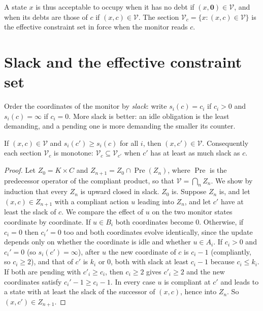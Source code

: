 A state $x$ is thus acceptable to occupy when it has no debt if $(x,\mathbf 0)\in\mathcal V$, and when its debts are those of $c$ if $(x,c)\in\mathcal V$. The section $\mathcal V_c=\{x:(x,c)\in\mathcal V\}$ is the effective constraint set in force when the monitor reads $c$.

\section{Slack and the effective constraint set}

Order the coordinates of the monitor by \emph{slack}: write $s_i(c)=c_i$ if $c_i>0$ and $s_i(c)=\infty$ if $c_i=0$. More slack is better: an idle obligation is the least demanding, and a pending one is more demanding the smaller its counter.

\begin{newresult}\label{prop:slack}
If $(x,c)\in\mathcal V$ and $s_i(c')\ge s_i(c)$ for all $i$, then $(x,c')\in\mathcal V$. Consequently each section $\mathcal V_c$ is monotone: $\mathcal V_c\subseteq\mathcal V_{c'}$ when $c'$ has at least as much slack as $c$.
\end{newresult}
\begin{proof}
Let $Z_0=K\times C$ and $Z_{n+1}=Z_0\cap\operatorname{Pre}(Z_n)$, where $\operatorname{Pre}$ is the predecessor operator of the compliant product, so that $\mathcal V=\bigcap_nZ_n$. We show by induction that every $Z_n$ is upward closed in slack. $Z_0$ is. Suppose $Z_n$ is, and let $(x,c)\in Z_{n+1}$ with a compliant action $u$ leading into $Z_n$, and let $c'$ have at least the slack of $c$. We compare the effect of $u$ on the two monitor states coordinate by coordinate. If $u\in B_i$ both coordinates become $0$. Otherwise, if $c_i=0$ then $c_i'=0$ too and both coordinates evolve identically, since the update depends only on whether the coordinate is idle and whether $u\in A_i$. If $c_i>0$ and $c_i'=0$ (so $s_i(c')=\infty$), after $u$ the new coordinate of $c$ is $c_i-1$ (compliantly, so $c_i\ge2$), and that of $c'$ is $k_i$ or $0$, both with slack at least $c_i-1$ because $c_i\le k_i$. If both are pending with $c'_i\ge c_i$, then $c_i\ge2$ gives $c'_i\ge2$ and the new coordinates satisfy $c_i'-1\ge c_i-1$. In every case $u$ is compliant at $c'$ and leads to a state with at least the slack of the successor of $(x,c)$, hence into $Z_n$. So $(x,c')\in Z_{n+1}$.
\end{proof}

